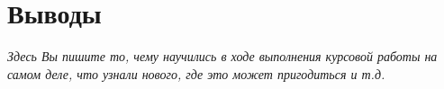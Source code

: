 \section{Выводы}
{\itshape Здесь Вы пишите то, чему научились в ходе выполнения курсовой работы на самом деле, что узнали нового, где это может пригодиться и т.д.}
\pagebreak

